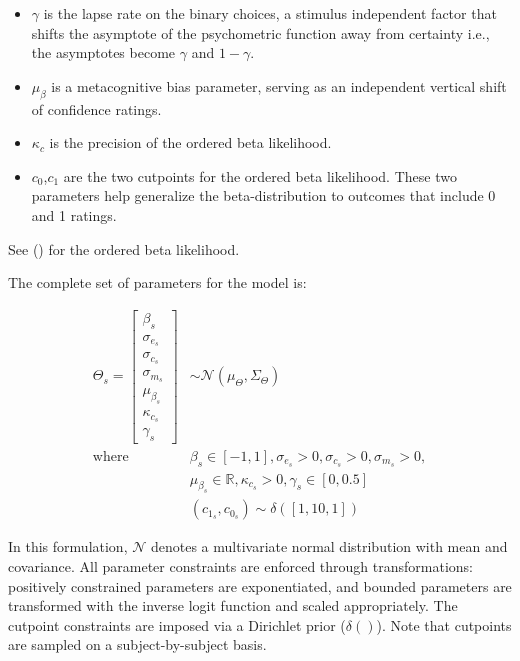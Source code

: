 \documentclass[
]{article}
\begin{document}
\begin{itemize}
\item
  \(\gamma\) is the lapse rate on the binary choices, a stimulus
  independent factor that shifts the asymptote of the psychometric
  function away from certainty i.e., the asymptotes become \(\gamma\)
  and \(1-\gamma\).
\item
  \(\mu_{\beta}\) is a metacognitive bias parameter, serving as an
  independent vertical shift of confidence ratings.
\item
  \(\kappa_c\) is the precision of the ordered beta likelihood.
\item
  \(c_0\),\(c_1\) are the two cutpoints for the ordered beta likelihood.
  These two parameters help generalize the beta-distribution to outcomes
  that include 0 and 1 ratings.
\end{itemize}

See
() for the ordered beta likelihood.

The complete set of parameters for the model is:

\[
\begin{aligned}
\Theta_s = \begin{bmatrix}
           \beta_s \\
           \sigma_{e_s} \\
           \sigma_{c_s} \\
           \sigma_{m_s} \\
           \mu_{\beta_s} \\
           \kappa_{c_s} \\
           \gamma_s 
         \end{bmatrix} 
         &\sim 
         \mathcal{N}(\mu_{\Theta},\Sigma_{\Theta}) \\
\text{where } \quad & \beta_s  \in [-1,1], \sigma_{e_s} >0, \sigma_{c_s} >0, \sigma_{m_s} > 0, \\
& \mu_{\beta_s} \in \mathbb{R}, \kappa_{c_s} > 0, \gamma_s \in [0,0.5] \\
& (c_{1_s} , c_{0_s}) \sim \delta([1,10,1])
\end{aligned}
\]

In this formulation, \(\mathcal{N}\) denotes a multivariate normal
distribution with mean and covariance. All parameter constraints are
enforced through transformations: positively constrained parameters are
exponentiated, and bounded parameters are transformed with the inverse
logit function and scaled appropriately. The cutpoint constraints are
imposed via a Dirichlet prior (\(\delta()\)). Note that cutpoints are
sampled on a subject-by-subject basis.
\end{document}
